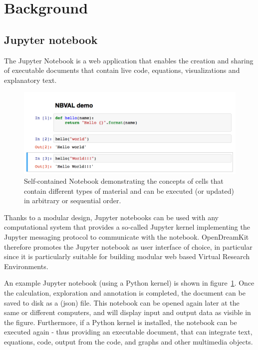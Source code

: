 \documentclass{deliverablereport}
\author{Martin Sandve Aln\ae{}s \& Hans Fangohr \& Vidar Fauske \& Thomas Kluyver \& Benjamin Ragan-Kelley \& MORE?}
\begin{document}
\maketitle
%
\strut\githubissuedescription
\newpage\tableofcontents\newpage

\newcommand{\nbval}{\texttt{nbval} }

\section{Background} %

\subsection{Jupyter notebook}
The Jupyter Notebook is a web application that enables the creation
and sharing of executable documents that contain live code,
equations, visualizations and explanatory text.


\begin{figure}
\centerline{\includegraphics[width=1.0\textwidth]{examples/demo.png}}
\caption{\label{fig:jupyterdemo} Self-contained \Jupyter Notebook
  demonstrating the concepts of cells that contain different types of
  material and can be executed (or updated) in arbitrary or sequential
  order.}
\end{figure}

Thanks to a modular design, Jupyter notebooks can be used with any
computational system that provides a so-called Jupyter kernel
implementing the Jupyter messaging protocol to communicate with the
notebook. OpenDreamKit therefore promotes the Jupyter notebook as user
interface of choice, in particular since it is particularly suitable
for building modular web based Virtual Research Environments.

An example Jupyter notebook (using a Python kernel) is shown in
figure~\ref{fig:jupyterdemo}. Once the calculation, exploration and
annotation is completed, the document can be saved to disk as a (json)
file. This notebook can be opened again later at the same or different
computers, and will display input and output data as visible in the
figure. Furthermore, if a Python kernel is installed, the notebook can
be executed again  - thus providing an executable document, that
can integrate text, equations, code, output from the code, and graphs and
other multimedia objects.
\end{document}
